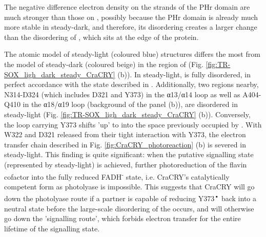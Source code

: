 The negative difference electron density on the strands of the PHr domain are much stronger than those on , possibly because the PHr domain is already much more stable in steady-dark, and therefore, its disordering creates a larger change than the disordering of , which sits at the edge of the protein. 

The atomic model of steady-light (coloured blue) structures differs the most from the model of steady-dark (coloured beige) in the region of  (Fig. \ref{fig:TR-SOX_ligh_dark_steady_CraCRY} (b)). In steady-light,  is fully disordered, in perfect accordance with the state described in \cite{zanglTimeResolvedIonMobility2024}. Additionally, two regions nearby, N314-D324 (which includes D321 and Y373) in the α13/α14 loop as well as A404-Q410  in the α18/α19 loop (background of the panel (b)), are disordered in steady-light (Fig. \ref{fig:TR-SOX_ligh_dark_steady_CraCRY} (b)). Conversely, the loop carrying Y373 shifts 'up' to into the space previously occupied by . With W322 and D321 released from their tight interaction with Y373, the electron transfer chain described in Fig. \ref{fig:CraCRY_photoreaction} (b) is severed in steady-light. 
\vspace{2mm}
This finding is quite significant: when the putative signalling state (represented by steady-light) is achieved, further photoreduction of the flavin cofactor into the fully reduced FADH\textsuperscript{-} state, i.e. CraCRY’s catalytically competent form as photolyase is impossible. This suggests that CraCRY will go down the photolyase route if a partner is capable of reducing Y373\textsuperscript{•} back into a neutral state before the large-scale disordering of the  occurs, and will otherwise go down the 'signalling route', which forbids electron transfer for the entire lifetime of the signalling state. 
\vspace{2mm}

